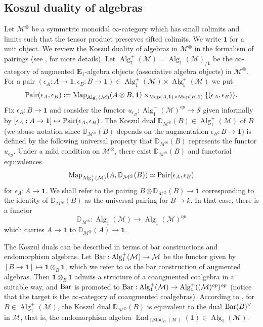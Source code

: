 \documentclass[leqno,12pt]{amsart}
\theoremstyle{plain}
\theoremstyle{definition}
\newcommand{\DD}{\mathbb{D}}
\newcommand{\uni}{\mathbf{1}}
\newcommand{\MMM}{\mathcal{M}}
\newcommand{\SSS}{\mathcal{S}}
\newcommand{\Map}{\operatorname{Map}}
\newcommand{\Alg}{\operatorname{Alg}}
\newcommand{\End}{\operatorname{End}}
\newcommand{\eone}{\mathbf{E}_1}
\newcommand{\LMod}{\operatorname{LMod}}
\begin{document}
\subsection{Koszul duality of algebras}
\label{koszulsec}
Let $\MMM^\otimes$ be a symmetric monoidal $\infty$-category which has small colimits and limits such that the tensor product preserves sifted colimits. We write $\uni$ for a unit object.
We review the Koszul duality of algebras in $\MMM^\otimes$ in the formalism of pairings (see \cite{HA}, \cite[X]{DAG} for more details).
Let $\Alg^+_{1}(\MMM)=\Alg_1(\MMM)_{/\uni}$ be the $\infty$-category of augmented $\eone$-algebra objects (associative algebra objects) in $\MMM^\otimes$.
For a pair $(\epsilon_A:A\to \uni,\epsilon_B:B \to \uni)\in \Alg^+_{1}(\MMM)\times \Alg^+_{1}(\MMM)$ we put
\[
\textup{Pair}(\epsilon_A,\epsilon_B):= \Map_{\Alg_{1}(\MMM)}(A\otimes B,\uni)\times_{\Map(A,\uni)\times\Map(B,\uni)}\{(\epsilon_A,\epsilon_B)\}.
\]
Fix $\epsilon_B:B \to \uni$ and consider the functor
$u_{\epsilon_B}:\Alg_1^+(\MMM)^{op}\to \SSS$ given informally by $[\epsilon_A:A\to \uni]\mapsto \textup{Pair}(\epsilon_A,\epsilon_B)$. 
The Koszul dual $\DD_{\MMM^\otimes}(B)\in \Alg_1^+(\MMM)$ of $B$ (we abuse notation since $\DD_{\MMM^\otimes}(B)$ depends on the augmentation $\epsilon_B:B \to \uni$)
is defined by the following universal property that $\DD_{\MMM^\otimes}(B)$ represents the functor $u_{\epsilon_B}$.
Under a mild condition on $\MMM^\otimes$, 
there exist $\DD_{\MMM^\otimes}(B)$ and functorial equivalences
\[
\Map_{\Alg_1^+(\MMM)}(A,\DD_{\MMM^\otimes}(B))\simeq \textup{Pair}(\epsilon_A,\epsilon_B)
\]
for $\epsilon_A:A\to \uni$. We shall refer to the pairing $B\otimes\DD_{\MMM^\otimes}(B)\to \uni$ 
corresponding to the identity of $\DD_{\MMM^\otimes}(B)$ as the universal pairing for $B\to k$.
In that case, there is a functor 
\[
\DD_{\MMM^\otimes}:\Alg_1(\MMM) \longrightarrow \Alg_1(\MMM)^{op}
\]
which carries $A\to \uni$ to $\DD_{\MMM^\otimes}(A)\to \uni$.

The Koszul duals can be described in terms of bar constructions and endomorphism algebras.
Let $\textup{Bar}:\Alg_{1}^+(\MMM)\to \MMM$ be the functor
given by $[B\to \uni] \mapsto \uni\otimes_B\uni$, which we refer to as the bar construction of augmented algebras.
Then $\uni\otimes_B\uni$ admits a structure of a coaugmented coalgebra in a suitable way, and $\textup{Bar}$
is promoted to $\textup{Bar}:\Alg_{1}^+(\MMM)\to \Alg^+_{1}((\MMM)^{op})^{op}$
(notice that the target is the $\infty$-category of coaugmented coalgebras).
According to \cite[X, Example 4.4.20]{DAG}, for $B\in \Alg^+_{1}(\MMM)$, the Koszul dual $\DD_{\MMM^\otimes}(B)$
is equivalent to
the dual $\textup{Bar}(B)^\vee$ in $\MMM$, that is, the endomorphism algebra $\End_{\LMod_B(\MMM)}(\uni)\in \Alg_1(\MMM)$.
\end{document}
